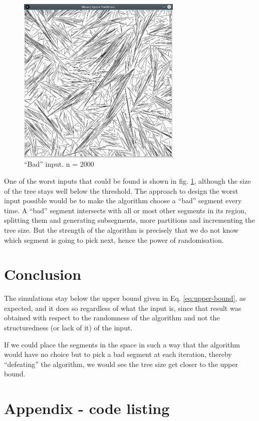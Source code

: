 \documentclass[12pt,a4paper]{article}
\begin{document}
\begin{figure}[ht!]
  \centering
  \includegraphics[width=0.7\textwidth]{img/bad-input2000.png}
  \caption{``Bad'' input. n = 2000}
  \label{fig:bad-input}
\end{figure}

One of the worst inputs that could be found is shown in
fig. \ref{fig:bad-input}, although the size of the tree stays well
below the threshold. The approach to design the worst input possible
would be to make the algorithm choose a ``bad'' segment every time. A
``bad'' segment intersects with all or most other segments in its
region, splitting them and generating subsegments, more partitions and
incrementing the tree size. But the strength of the algorithm is
precisely that we do not know which segment is going to pick next,
hence the power of randomisation.

\section{Conclusion}

The simulations stay below the upper bound given in
Eq. \ref{eq:upper-bound}, as expected, and it does so regardless of
what the input is, since that result was obtained with respect to the
randomness of the algorithm and not the structuredness (or lack of it)
of the input.

If we could place the segments in the space in such a way that the
algorithm would have no choice but to pick a bad segment at each
iteration, thereby ``defeating'' the algorithm, we would see the tree
size get closer to the upper bound.

\appendix
\section{Appendix - code listing}

\inputminted[label=common.clj]{clojure}{../src/bspace_part/common.clj}
\inputminted[label=geometry.clj]{clojure}{../src/bspace_part/geometry.clj}
\inputminted[label=core.clj]{clojure}{../src/bspace_part/core.clj}

\nocite{*}


\end{document}

